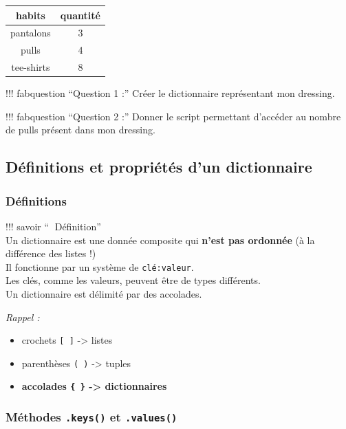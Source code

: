 \documentclass[
]{article}
\providecommand{\tightlist}{%
  \setlength{\itemsep}{0pt}\setlength{\parskip}{0pt}}
\begin{document}
\begin{longtable}[]{@{}cc@{}}
\toprule
habits & quantité\tabularnewline
\midrule
\endhead
pantalons & 3\tabularnewline
pulls & 4\tabularnewline
tee-shirts & 8\tabularnewline
\bottomrule
\end{longtable}

!!! fabquestion ``Question 1 :'' Créer le dictionnaire représentant mon
dressing.

!!! fabquestion ``Question 2 :'' Donner le script permettant d'accéder
au nombre de pulls présent dans mon dressing.

\hypertarget{duxe9finitions-et-propriuxe9tuxe9s-dun-dictionnaire}{%
\subsection{Définitions et propriétés d'un
dictionnaire}\label{duxe9finitions-et-propriuxe9tuxe9s-dun-dictionnaire}}

\hypertarget{duxe9finitions}{%
\subsubsection{Définitions}\label{duxe9finitions}}

!!! savoir ``📘 Définition''\\
Un dictionnaire est une donnée composite qui \textbf{n'est pas ordonnée}
(à la différence des listes !)\\
Il fonctionne par un système de \texttt{clé:valeur}.\\
Les clés, comme les valeurs, peuvent être de types différents.\\
Un dictionnaire est délimité par des accolades.

\emph{Rappel :}

\begin{itemize}
\tightlist
\item
  crochets \texttt{{[}\ {]}} -\textgreater{} listes
\item
  parenthèses \texttt{(\ )} -\textgreater{} tuples
\item
  \textbf{accolades \texttt{\{\ \}} -\textgreater{} dictionnaires}
\end{itemize}

\hypertarget{muxe9thodes-.keys-et-.values}{%
\subsubsection{\texorpdfstring{Méthodes \texttt{.keys()} et
\texttt{.values()}}{Méthodes .keys() et .values()}}\label{muxe9thodes-.keys-et-.values}}
\end{document}
